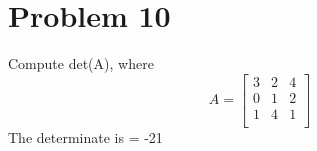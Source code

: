 \documentclass[11pt,a4paper,openany]{report}
\begin{document}
\section{Problem 10}
Compute det(A), where
\[A=
\begin{bmatrix} 
3 & 2 & 4\\
0 & 1 & 2 \\
1 & 4 & 1 \\
\end{bmatrix}
\]
The determinate is = -21
\end{document}
